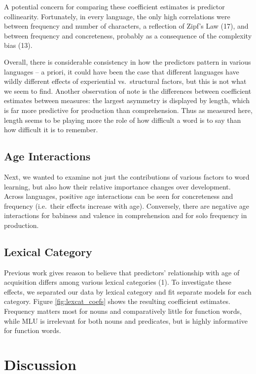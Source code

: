 \documentclass[9pt,twocolumn,twoside]{pnas-new}
\begin{document}
A potential concern for comparing these coefficient estimates is
predictor collinearity. Fortunately, in every language, the only high
correlations were between frequency and number of characters, a
reflection of Zipf's Law (17), and between frequency and concreteness,
probably as a consequence of the complexity bias (13).

Overall, there is considerable consistency in how the predictors pattern
in various languages -- a priori, it could have been the case that
different languages have wildly different effects of experiential
vs.~structural factors, but this is not what we seem to find. Another
observation of note is the differences between coefficient estimates
between measures: the largest asymmetry is displayed by length, which is
far more predictive for production than comprehension. Thus as measured
here, length seems to be playing more the role of how difficult a word
is to say than how difficult it is to remember.

\subsection{Age Interactions}\label{age-interactions}

Next, we wanted to examine not just the contributions of various factors
to word learning, but also how their relative importance changes over
development. Across languages, positive age interactions can be seen for
concreteness and frequency (i.e.~their effects increase with age).
Conversely, there are negative age interactions for babiness and valence
in comprehension and for solo frequency in production.

\subsection{Lexical Category}\label{lexical-category}

Previous work gives reason to believe that predictors' relationship with
age of acquisition differs among various lexical categories (1). To
investigate these effects, we separated our data by lexical category and
fit separate models for each category. Figure \ref{fig:lexcat_coefs}
shows the resulting coefficient estimates. Frequency matters most for
nouns and comparatively little for function words, while MLU is
irrelevant for both nouns and predicates, but is highly informative for
function words.

\section*{Discussion}\label{discussion}
\end{document}
